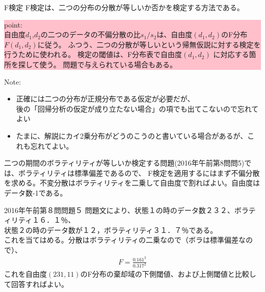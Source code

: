 \documentclass[dvipdfmx,autodetect-engine, unicode, 10pt, aspectratio=169]{beamer}
\begin{document}
\begin{frame}{F検定}
    F検定は、二つの分布の分散が等しいか否かを検定する方法である。 \\
    
    \begin{center}
    {\footnotesize
        \colorbox{pink}{
            \begin{minipage}[t]{0.9\textwidth}
                point: \\
                自由度$d_1$,$d_2$の二つのデータの不偏分散の比$s_1 / s_2$は、自由度$(d_1, d_2)$のF分布$F(d_1, d_2)$に従う。
                ふつう、二つの分散が等しいという帰無仮説に対する検定を行うために使われる。
                検定の閾値は、F分布表で自由度$(d_1, d_2)$ に対応する箇所を探して使う。 \scriptsize{問題で与えられている場合もある。}
            \end{minipage}
        }
    }
    \end{center}
    {\footnotesize
        Note:
        \begin{itemize}
            \item 正確には二つの分布が正規分布である仮定が必要だが、 \\
            後の「回帰分析の仮定が成り立たない場合」の項でも出てこないので忘れてよい
            \item たまに、解説にカイ2乗分布がどうのこうのと書いている場合があるが、これも忘れてよい。
        \end{itemize}
        }
    二つの期間のボラティリティが等しいか検定する問題(2016年午前第8問問5)では、ボラティリティは標準偏差であるので、
    F検定を適用するにはまず不偏分散を求める。不変分散はボラティリティを二乗して自由度で割ればよい。自由度はデータ数-1である。
    
\end{frame}

\begin{frame}{2016年午前第８問問題５}
    問題文により、状態１の時のデータ数２３２、ボラティリティ１６．１％、\\
    状態２の時のデータ数が１２，ボラティリティ３１．７％である。\\
    これを当てはめる。分散はボラティリティの二乗なので（ボラは標準偏差なので）、
    \begin{align*}
        F = \frac{0.161^2}{0.317^2}
    \end{align*}
    これを自由度$(231, 11)$のF分布の棄却域の下側閾値、および上側閾値と比較して回答すればよい。

\end{frame}
\end{document}
